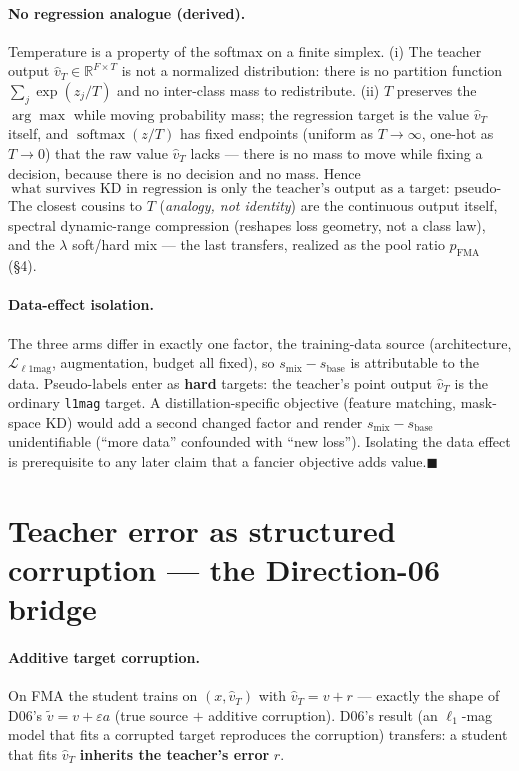 \documentclass[11pt]{article}
\newcommand{\code}[1]{\texttt{#1}}
\DeclareMathOperator{\softmax}{softmax}
\newcommand{\vhatT}{\hat v_T}
\newcommand{\sbase}{s_{\text{base}}}
\newcommand{\smix}{s_{\text{mix}}}
\newcommand{\pfma}{p_{\text{FMA}}}
\begin{document}
\paragraph{No regression analogue (derived).} Temperature is a property of the softmax on a finite
simplex. (i) The teacher output $\vhatT\in\mathbb R^{F\times T}$ is not a normalized distribution:
there is no partition function $\sum_j\exp(z_j/T)$ and no inter-class mass to redistribute. (ii)
$T$ preserves the $\arg\max$ while moving probability mass; the regression target is the value
$\vhatT$ itself, and $\softmax(z/T)$ has fixed endpoints (uniform as $T\to\infty$, one-hot as
$T\to0$) that the raw value $\vhatT$ lacks --- there is no mass to move while fixing a decision,
because there is no decision and no mass. Hence
\[
\boxed{\ \text{what survives KD in regression is only the teacher's output as a target: pseudo-labeling.}\ }
\]
The closest cousins to $T$ (\emph{analogy, not identity}) are the continuous output itself,
spectral dynamic-range compression (reshapes loss geometry, not a class law), and the $\lambda$
soft/hard mix --- the last transfers, realized as the pool ratio $\pfma$ (\S4).

\paragraph{Data-effect isolation.} The three arms differ in exactly one factor, the training-data
source (architecture, $\mathcal L_{\ell1\text{mag}}$, augmentation, budget all fixed), so
$\smix-\sbase$ is attributable to the data. Pseudo-labels enter as \textbf{hard} targets: the
teacher's point output $\vhatT$ is the ordinary \code{l1mag} target. A distillation-specific
objective (feature matching, mask-space KD) would add a second changed factor and render
$\smix-\sbase$ unidentifiable (``more data'' confounded with ``new loss''). Isolating the data
effect is prerequisite to any later claim that a fancier objective adds value.\hfill$\blacksquare$

\section{Teacher error as structured corruption --- the Direction-06 bridge}

\paragraph{Additive target corruption.} On FMA the student trains on $(x,\vhatT)$ with
$\vhatT=v+r$ --- exactly the shape of D06's $\tilde v=v+\varepsilon a$ (true source $+$ additive
corruption). D06's result (an $\ell_1$-mag model that fits a corrupted target reproduces the
corruption) transfers: a student that fits $\vhatT$ \textbf{inherits the teacher's error} $r$.
\end{document}

